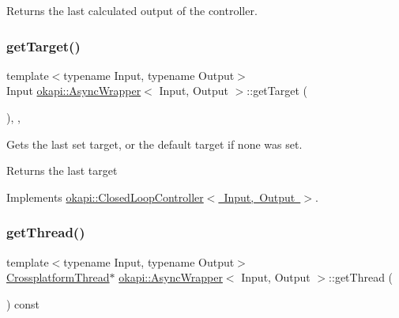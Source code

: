 Returns the last calculated output of the controller. \mbox{\label{classokapi_1_1AsyncWrapper_a2471c7b5f388d441db77fa9199db7b83}} 
\subsubsection{\texorpdfstring{getTarget()}{getTarget()}}
{\footnotesize\ttfamily template$<$typename Input, typename Output$>$ \\
Input \mbox{\hyperlink{classokapi_1_1AsyncWrapper}{okapi\+::\+Async\+Wrapper}}$<$ Input, Output $>$\+::get\+Target (\begin{DoxyParamCaption}{ }\end{DoxyParamCaption})\hspace{0.3cm}{\ttfamily [inline]}, {\ttfamily [override]}, {\ttfamily [virtual]}}

Gets the last set target, or the default target if none was set.

\begin{DoxyReturn}{Returns}
the last target 
\end{DoxyReturn}


Implements \mbox{\hyperlink{classokapi_1_1ClosedLoopController_a22012bedbfaff6e5a3a508f274ec2497}{okapi\+::\+Closed\+Loop\+Controller$<$ Input, Output $>$}}.

\mbox{\label{classokapi_1_1AsyncWrapper_aef499c3f854e809951f6fa4f2d3ff40e}} 
\subsubsection{\texorpdfstring{getThread()}{getThread()}}
{\footnotesize\ttfamily template$<$typename Input, typename Output$>$ \\
\mbox{\hyperlink{classCrossplatformThread}{Crossplatform\+Thread}}$\ast$ \mbox{\hyperlink{classokapi_1_1AsyncWrapper}{okapi\+::\+Async\+Wrapper}}$<$ Input, Output $>$\+::get\+Thread (\begin{DoxyParamCaption}{ }\end{DoxyParamCaption}) const\hspace{0.3cm}{\ttfamily [inline]}}

